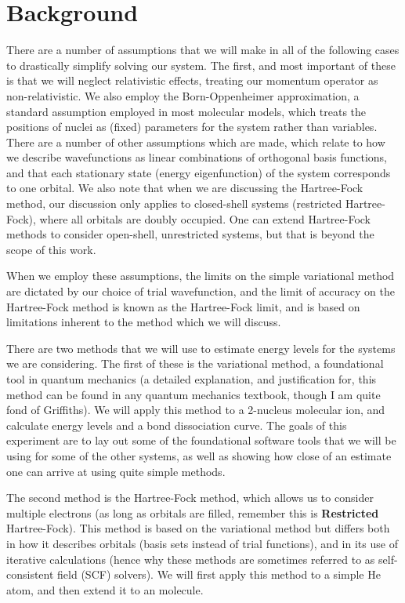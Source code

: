 \documentclass[journal=jacsat,manuscript=communication]{achemso}
\begin{document}
\section{Background}
There are a number of assumptions that we will make in all of the following cases to drastically simplify solving our system.  The first, and most important of these is that we will neglect relativistic effects, treating our momentum operator as non-relativistic.  We also employ the Born-Oppenheimer approximation, a standard assumption employed in most molecular models, which treats the positions of nuclei as (fixed) parameters for the system rather than variables.  There are a number of other assumptions which are made, which relate to how we describe wavefunctions as linear combinations of orthogonal basis functions, and that each stationary state (energy eigenfunction) of the system corresponds to one orbital.  We also note that when we are discussing the Hartree-Fock method, our discussion only applies to closed-shell systems (restricted Hartree-Fock), where all orbitals are doubly occupied. One can extend Hartree-Fock methods to consider open-shell, unrestricted systems, but that is beyond the scope of this work. 

When we employ these assumptions, the limits on the simple variational method are dictated by our choice of trial wavefunction, and the limit of accuracy on the Hartree-Fock method is known as the Hartree-Fock limit, and is based on limitations inherent to the method which we will discuss. 

There are two methods that we will use to estimate energy levels for the systems we are considering.  The first of these is the variational method, a foundational tool in quantum mechanics (a detailed explanation, and justification for, this method can be found in any quantum mechanics textbook, though I am quite fond of Griffiths\cite{griffithsIntroductionQuantumMechanics2018}).  We will apply this method to a 2-nucleus  molecular ion, and calculate energy levels and a bond dissociation curve.  The goals of this experiment are to lay out some of the foundational software tools that we will be using for some of the other systems, as well as showing how close of an estimate one can arrive at using quite simple methods.

The second method is the Hartree-Fock method, which allows us to consider multiple electrons (as long as orbitals are filled, remember this is \textbf{Restricted} Hartree-Fock).  This method is based on the variational method but differs both in how it describes orbitals (basis sets instead of trial functions), and in its use of iterative calculations (hence why these methods are sometimes referred to as self-consistent field (SCF) solvers).  We will first apply this method to a simple He atom, and then extend it to an  molecule.  
\end{document}

